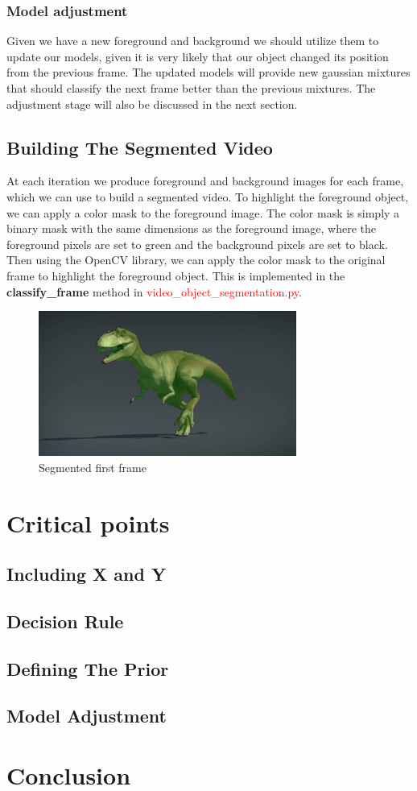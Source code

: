 \documentclass[12pt]{article}
\begin{document}
\subsubsection{Model adjustment}\label{subsubsec:model-adjust}
Given we have a new foreground and background we should utilize them to update our models, given it is very likely that our object changed its position from the previous frame.
The updated models will provide new gaussian mixtures that should classify the next frame better than the previous mixtures.
The adjustment stage will also be discussed in the next section.
\pagebreak

\subsection{Building The Segmented Video}\label{subsec:build-segment-video}
At each iteration we produce foreground and background images for each frame, which we can use to build a segmented video.
To highlight the foreground object, we can apply a color mask to the foreground image.
The color mask is simply a binary mask with the same dimensions as the foreground image, where the foreground pixels are set to green and the background pixels are set to black.
Then using the OpenCV library, we can apply the color mask to the original frame to highlight the foreground object.
This is implemented in the \textbf{classify\_frame} method in \textcolor{red}{video\_object\_segmentation.py}.
\begin{figure}[h!]
    \centering
    \includegraphics[scale=1]{new_frames/dinosaur_best/frame0}
    \caption{Segmented first frame}
    \label{fig:segmented-video}
\end{figure}

\pagebreak
    \section{Critical points}\label{sec:critical}
\subsection{Including X and Y}\label{subsec:xy}
\subsection{Decision Rule}\label{subsec:decision}
\subsection{Defining The Prior}\label{subsec:prior}
\subsection{Model Adjustment}\label{subsec:model}
    \section{Conclusion}\label{sec:conclusion}
\end{document}
